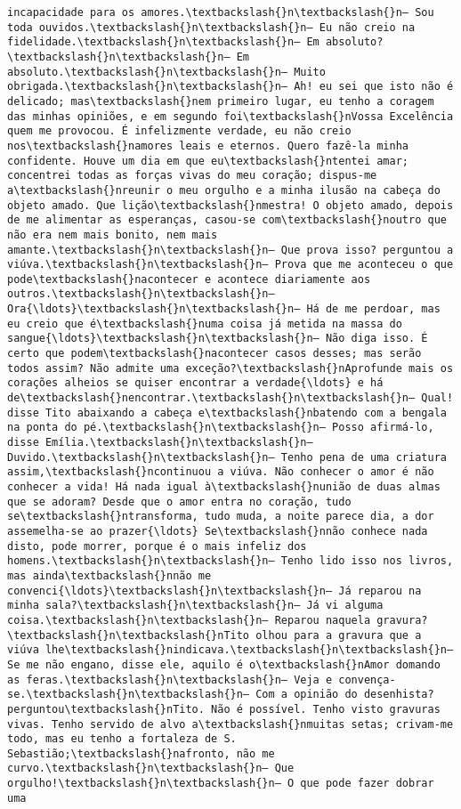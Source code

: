 \documentclass[11pt]{article}
\begin{document}
\begin{Verbatim}[commandchars=\\\{\}]
incapacidade para os amores.\textbackslash{}n\textbackslash{}n— Sou toda ouvidos.\textbackslash{}n\textbackslash{}n— Eu não creio na fidelidade.\textbackslash{}n\textbackslash{}n— Em absoluto?\textbackslash{}n\textbackslash{}n— Em absoluto.\textbackslash{}n\textbackslash{}n— Muito obrigada.\textbackslash{}n\textbackslash{}n— Ah! eu sei que isto não é delicado; mas\textbackslash{}nem primeiro lugar, eu tenho a coragem das minhas opiniões, e em segundo foi\textbackslash{}nVossa Excelência quem me provocou. É infelizmente verdade, eu não creio nos\textbackslash{}namores leais e eternos. Quero fazê-la minha confidente. Houve um dia em que eu\textbackslash{}ntentei amar; concentrei todas as forças vivas do meu coração; dispus-me a\textbackslash{}nreunir o meu orgulho e a minha ilusão na cabeça do objeto amado. Que lição\textbackslash{}nmestra! O objeto amado, depois de me alimentar as esperanças, casou-se com\textbackslash{}noutro que não era nem mais bonito, nem mais amante.\textbackslash{}n\textbackslash{}n— Que prova isso? perguntou a viúva.\textbackslash{}n\textbackslash{}n— Prova que me aconteceu o que pode\textbackslash{}nacontecer e acontece diariamente aos outros.\textbackslash{}n\textbackslash{}n— Ora{\ldots}\textbackslash{}n\textbackslash{}n— Há de me perdoar, mas eu creio que é\textbackslash{}numa coisa já metida na massa do sangue{\ldots}\textbackslash{}n\textbackslash{}n— Não diga isso. É certo que podem\textbackslash{}nacontecer casos desses; mas serão todos assim? Não admite uma exceção?\textbackslash{}nAprofunde mais os corações alheios se quiser encontrar a verdade{\ldots} e há de\textbackslash{}nencontrar.\textbackslash{}n\textbackslash{}n— Qual! disse Tito abaixando a cabeça e\textbackslash{}nbatendo com a bengala na ponta do pé.\textbackslash{}n\textbackslash{}n— Posso afirmá-lo, disse Emília.\textbackslash{}n\textbackslash{}n— Duvido.\textbackslash{}n\textbackslash{}n— Tenho pena de uma criatura assim,\textbackslash{}ncontinuou a viúva. Não conhecer o amor é não conhecer a vida! Há nada igual à\textbackslash{}nunião de duas almas que se adoram? Desde que o amor entra no coração, tudo se\textbackslash{}ntransforma, tudo muda, a noite parece dia, a dor assemelha-se ao prazer{\ldots} Se\textbackslash{}nnão conhece nada disto, pode morrer, porque é o mais infeliz dos homens.\textbackslash{}n\textbackslash{}n— Tenho lido isso nos livros, mas ainda\textbackslash{}nnão me convenci{\ldots}\textbackslash{}n\textbackslash{}n— Já reparou na minha sala?\textbackslash{}n\textbackslash{}n— Já vi alguma coisa.\textbackslash{}n\textbackslash{}n— Reparou naquela gravura?\textbackslash{}n\textbackslash{}nTito olhou para a gravura que a viúva lhe\textbackslash{}nindicava.\textbackslash{}n\textbackslash{}n— Se me não engano, disse ele, aquilo é o\textbackslash{}nAmor domando as feras.\textbackslash{}n\textbackslash{}n— Veja e convença-se.\textbackslash{}n\textbackslash{}n— Com a opinião do desenhista? perguntou\textbackslash{}nTito. Não é possível. Tenho visto gravuras vivas. Tenho servido de alvo a\textbackslash{}nmuitas setas; crivam-me todo, mas eu tenho a fortaleza de S. Sebastião;\textbackslash{}nafronto, não me curvo.\textbackslash{}n\textbackslash{}n— Que orgulho!\textbackslash{}n\textbackslash{}n— O que pode fazer dobrar uma 
\end{Verbatim}
\end{document}
